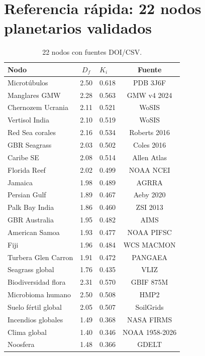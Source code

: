 \documentclass[12pt, a4paper]{article}
\theoremstyle{miuThm}
\theoremstyle{remark}
\begin{document}
\section{Referencia rápida: 22 nodos planetarios validados}
\label{app:nodos_planetarios}
\begin{table}[h!]
\centering
\caption{22 nodos con fuentes DOI/CSV.}
\label{tab:ref_rapida}
\begin{tabular}{lclc}
\toprule
\textbf{Nodo} & \textbf{$D_f$} & \textbf{$K_i$} & \textbf{Fuente} \\
\midrule
Microtúbulos & 2.50 & 0.618 & PDB 3J6F \\
Manglares GMW & 2.28 & 0.563 & GMW v4 2024 \\
Chernozem Ucrania & 2.11 & 0.521 & WoSIS \\
Vertisol India & 2.10 & 0.519 & WoSIS \\
Red Sea corales & 2.16 & 0.534 & Roberts 2016 \\
GBR Seagrass & 2.03 & 0.502 & Coles 2016 \\
Caribe SE & 2.08 & 0.514 & Allen Atlas \\
Florida Reef & 2.02 & 0.499 & NOAA NCEI \\
Jamaica & 1.98 & 0.489 & AGRRA \\
Persian Gulf & 1.89 & 0.467 & Aeby 2020 \\
Palk Bay India & 1.86 & 0.460 & ZSI 2013 \\
GBR Australia & 1.95 & 0.482 & AIMS \\
American Samoa & 1.93 & 0.477 & NOAA PIFSC \\
Fiji & 1.96 & 0.484 & WCS MACMON \\
Turbera Glen Carron & 1.91 & 0.472 & PANGAEA \\
Seagrass global & 1.76 & 0.435 & VLIZ \\
Biodiversidad flora & 2.31 & 0.570 & GBIF 875M \\
Microbioma humano & 2.50 & 0.508 & HMP2 \\
Suelo fértil global & 2.05 & 0.507 & SoilGrids \\
Incendios globales & 1.49 & 0.368 & NASA FIRMS \\
Clima global & 1.40 & 0.346 & NOAA 1958-2026 \\
Noosfera & 1.48 & 0.366 & GDELT \\
\bottomrule
\end{tabular}
\end{table}
\end{document}
